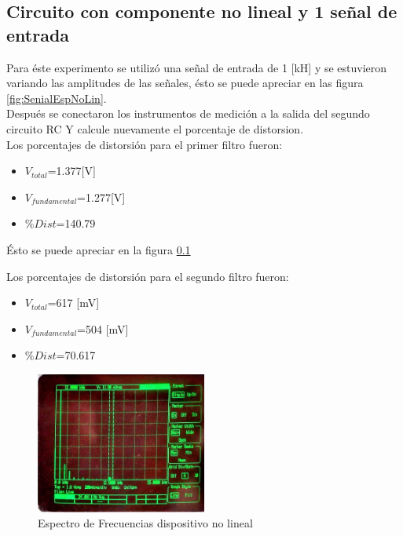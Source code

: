 \documentclass{article}
\begin{document}
\subsection{Circuito con componente no lineal y 1 señal de entrada}

Para éste experimento se utilizó una señal de entrada de 1 [kH] y se estuvieron variando las amplitudes de las señales, ésto se puede apreciar en las figura \ref{fig:SenialEspNoLin}.\\

Después se conectaron los instrumentos de medición a la salida del segundo circuito RC Y calcule nuevamente el porcentaje de distorsion.\\

Los porcentajes de distorsión para el primer filtro fueron:\\

\begin{itemize}
    \item $V_{total}$=1.377[V]
    \item $V_{fundamental}$=1.277[V]
    \item $\%Dist$=140.79
\end{itemize}

Ésto se puede apreciar en la figura \ref{}

Los porcentajes de distorsión para el segundo filtro fueron:\\

\begin{itemize}
    \item $V_{total}$=617 [mV]
    \item $V_{fundamental}$=504 [mV]
     \item $\%Dist$=70.617
\end{itemize}





\begin{figure}[h!]
    \centering
    \includegraphics[width=0.5\textwidth]{Imagenes/SistComDistAlin.jpg}
    \caption{Espectro de Frecuencias dispositivo no lineal}
    \label{fig:espNoLin}
\end{figure}
\end{document}
